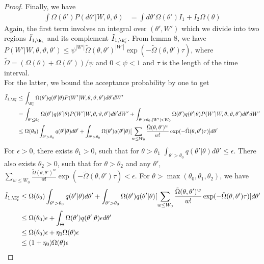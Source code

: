 \begin{proof}
Finally, we have
\begin{align*}
  \int \Omega(\theta') P(d\theta'| W, \theta, \vartheta)  
  &= \int d\theta' \Omega(\theta') I_1 + I_2 \Omega(\theta)
\end{align*}
Again, the first term involves an integral over $(\theta',W')$ which we 
divide into two regions $\tilde{I}_{1,\E_\epsilon}$ and its complement 
$\tilde{I}_{1,\E^c_\epsilon}$. From lemma 8, we have 
$P(W' | W, \theta, \vartheta, \theta') \le \psi ^{|W'|} \tilde{\Omega}(\theta,\theta')^{|W'|}\exp(-\tilde{\Omega}(\theta,\theta')\tau)$, where $\tilde{\Omega} = (\Omega(\theta) + \Omega(\theta')) / \psi$ and $0 < \psi < 1$ and $\tau$ is the length of the time interval.\\
For the latter, we bound the acceptance probability 
by one to get
\begin{align*}
  \tilde{I}_{1,\E^c_\epsilon} &\le  \int_{\E^c_\epsilon}  \Omega(\theta') q(\theta' | \theta)P(W' | W, \theta, \vartheta, \theta')d\theta'dW'\\
  &=  \int_{\theta' \leq \theta_0}  \Omega(\theta') q(\theta' | \theta)P(W' | W, \theta, \vartheta, \theta')d\theta'dW' +  \int_{\theta' > \theta_0, |W'| < W_0}  \Omega(\theta') q(\theta' | \theta)P(W' | W, \theta, \vartheta, \theta')d\theta'dW'\\
  & \leq  \Omega(\theta_0) \int_{\theta' > \theta_0}q(\theta' | \theta) d\theta' + \int_{\theta' > \theta_0} \Omega(\theta') q(\theta' | \theta) [ \sum_{w \le W_0}\frac{\tilde{\Omega}(\theta,\theta')^{w}}{w!}\exp(-\tilde{\Omega}(\theta,\theta')\tau)]d\theta'\\
  \end{align*}
  For $\epsilon > 0$, there exists $\theta_1 > 0$, such that for $\theta > \theta_1$ $\int_{\theta' > \theta_0}q(\theta' | \theta) d\theta' \le \epsilon$. There also exists $\theta_2 > 0$, such that for $\theta > \theta_2$ and any $\theta'$,  $\sum_{w \le W_0}\frac{\tilde{\Omega}(\theta,\theta')^{w}}{w!}\exp(-\tilde{\Omega}(\theta,\theta')\tau) < \epsilon$. For $\theta > \max(\theta_0, \theta_1, \theta_2)$, we have
\begin{align*}
\tilde{I}_{1,\E^c_\epsilon} &\le \Omega(\theta_0) \int_{\theta' > \theta_0}q(\theta' | \theta) d\theta' + \int_{\theta' > \theta_0} \Omega(\theta') q(\theta' | \theta) [ \sum_{w \le W_0}\frac{\tilde{\Omega}(\theta,\theta')^{w}}{w!}\exp(-\tilde{\Omega}(\theta,\theta')\tau)]d\theta'\\
& \le  \Omega(\theta_0) \epsilon + \int_{\Theta} \Omega(\theta') q(\theta' | \theta)\epsilon d\theta' \\
& \le \Omega(\theta_0) \epsilon + \eta_0 \Omega(\theta)\epsilon \\
& \le (1 + \eta_0) \Omega(\theta)\epsilon
\end{align*}


\end{proof}
